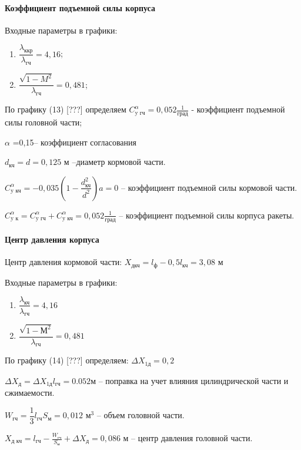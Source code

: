 \clearpage
\paragraph{Коэффициент подъемной силы корпуса}

Входные параметры в графики:
\begin{enumerate}
	\item $ \dfrac{\lambda_\text{ккр}}{\lambda_\text{гч}} = 4,16$;
	\item $ \dfrac{\sqrt{1-M^2}}{\lambda_\text{гч}} = 0,481$;
\end{enumerate}

По графику (13) [???] определяем $C_\text{y гч}^\alpha = 0,052 \frac{1}{\text{град}} $ - коэффициент подъемной силы головной части;

$\alpha$ =0,15– коэффициент согласования

$d_\text{кч}=d=0,125$ м –диаметр кормовой части.

$C_\text{y кч}^\alpha=-0,035 \left(1-\dfrac{d_\text{кч}^2}{d^2} \right) a=0$ – коэффициент подъемной силы кормовой части.

$C_\text{y к}^\alpha=C_\text{y гч}^\alpha + C_\text{y кч}^\alpha = 0,052 \frac{1}{град}$ – коэффициент подъемной силы корпуса ракеты.

\paragraph{Центр давления корпуса}

Центр давления кормовой части: $X_\text{дкч}=l_\text{ф}- 0,5 l_\text{кч}=3,08$ м

Входные параметры в графики:
\begin{enumerate}
	\item $\dfrac{\lambda_\text{кч}} {\lambda_\text{гч}} =4,16$
	\item $\dfrac{\sqrt{1-М^2}}{\lambda_\text{гч}} =0,481$
\end{enumerate}

По графику (14) [???] определяем: $\Delta X_\text{1д}=0,2$

$\Delta X_\text{д}= \Delta X_\text{1д} l_\text{гч}=0.052 м$ – поправка на учет влияния цилиндрической части и сжимаемости.

$W_\text{гч}=\dfrac{1}{3} l_\text{гч} S_\text{м}=0,012 \text{ м}^3$ – объем головной части.

$X_\text{д кч}=l_\text{гч}- \frac{W_\text{гч}}{S_\text{м}} + \Delta X_\text{д}=0,086$ м – центр давления головной части.

